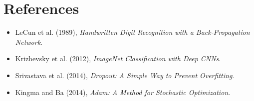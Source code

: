 \documentclass[12pt]{article}
\begin{document}
\section{References}
\vspace{-0.5em}
\begin{itemize}
    \item LeCun et al. (1989), \textit{Handwritten Digit Recognition with a Back-Propagation Network}.
    \item Krizhevsky et al. (2012), \textit{ImageNet Classification with Deep CNNs}.
    \item Srivastava et al. (2014), \textit{Dropout: A Simple Way to Prevent Overfitting}.
    \item Kingma and Ba (2014), \textit{Adam: A Method for Stochastic Optimization}.
\end{itemize}
\end{document}
